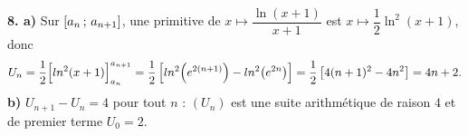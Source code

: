 \begin{corrige}
\textbf{8. a)} Sur $\intervalle{a_{n}}{a_{n+1}}$, une primitive de
$x\mapsto\dfrac{\ln(x+1)}{x+1}$ est $x\mapsto\dfrac{1}{2}\ln^{2}(x+1)$, donc
\[
  U_{n} = \frac12\Bigl[\ln^{2}(x+1)\Bigr]_{a_{n}}^{a_{n+1}}
  = \frac12\left[\ln^{2}\!\left(e^{2(n+1)}\right) - \ln^{2}\!\left(e^{2n}\right)\right]
  = \frac12\left[4(n+1)^{2}-4n^{2}\right] = 4n+2 .
\]
\textbf{b)} $U_{n+1}-U_{n} = 4$ pour tout $n$ : $\left(U_{n}\right)$ est une
suite arithmétique de raison $4$ et de premier terme $U_{0}=2$.
\end{corrige}
